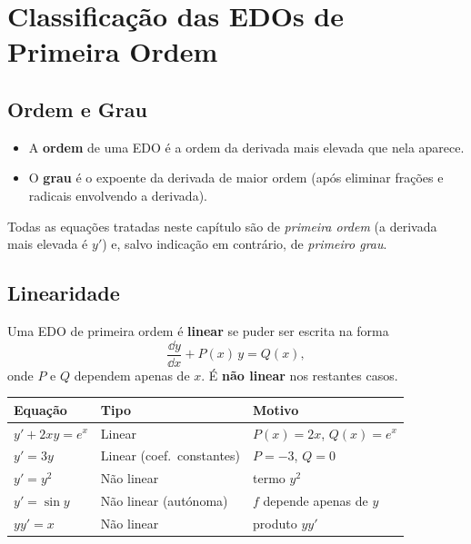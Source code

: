 \section{Classificação das EDOs de Primeira Ordem}
\label{sec:classification5}

\subsection{Ordem e Grau}

\begin{defbox}[title={Ordem e Grau de uma EDO}]
  \begin{itemize}
    \item A \textbf{ordem} de uma EDO é a ordem da derivada mais elevada que nela aparece.
    \item O \textbf{grau} é o expoente da derivada de maior ordem (após eliminar frações e
          radicais envolvendo a derivada).
  \end{itemize}
\end{defbox}

Todas as equações tratadas neste capítulo são de \emph{primeira ordem} (a derivada mais elevada
é $y'$) e, salvo indicação em contrário, de \emph{primeiro grau}.

\subsection{Linearidade}

\begin{defbox}[title={EDO Linear de Primeira Ordem}]
  Uma EDO de primeira ordem é \textbf{linear} se puder ser escrita na forma
  \[
    \frac{\dd y}{\dd x} + P(x)\,y = Q(x),
  \]
  onde $P$ e $Q$ dependem apenas de $x$. É \textbf{não linear} nos restantes casos.
\end{defbox}

\begin{center}
\renewcommand{\arraystretch}{1.3}
\begin{tabular}{lll}
  \toprule
  \textbf{Equação} & \textbf{Tipo} & \textbf{Motivo} \\
  \midrule
  $y' + 2xy = e^x$  & Linear                      & $P(x)=2x$, $Q(x)=e^x$ \\
  $y' = 3y$          & Linear (coef.\ constantes)  & $P=-3$, $Q=0$ \\
  $y' = y^2$         & Não linear                  & termo $y^2$ \\
  $y' = \sin y$      & Não linear (autónoma)       & $f$ depende apenas de $y$ \\
  $yy' = x$          & Não linear                  & produto $yy'$ \\
  \bottomrule
\end{tabular}
\end{center}

